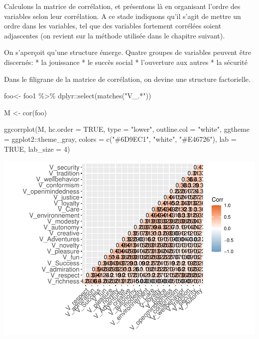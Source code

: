 \documentclass[
]{book}
\newenvironment{Shaded}{\begin{snugshade}}{\end{snugshade}}
\newcommand{\AttributeTok}[1]{\textcolor[rgb]{0.77,0.63,0.00}{#1}}
\newcommand{\ConstantTok}[1]{\textcolor[rgb]{0.00,0.00,0.00}{#1}}
\newcommand{\DecValTok}[1]{\textcolor[rgb]{0.00,0.00,0.81}{#1}}
\newcommand{\FunctionTok}[1]{\textcolor[rgb]{0.00,0.00,0.00}{#1}}
\newcommand{\NormalTok}[1]{#1}
\newcommand{\OtherTok}[1]{\textcolor[rgb]{0.56,0.35,0.01}{#1}}
\newcommand{\SpecialCharTok}[1]{\textcolor[rgb]{0.00,0.00,0.00}{#1}}
\newcommand{\StringTok}[1]{\textcolor[rgb]{0.31,0.60,0.02}{#1}}
\begin{document}
Calculons la matrice de corrélation, et présentons là en organisant l'ordre des variables selon leur corrélation. A ce stade indiquons qu'il s'agit de mettre un ordre dans les variables, tel que des variables fortement corrélées soient adjascentes (on revient sur la méthode utilisée dans le chapitre suivant).

On s'aperçoit qu'une structure émerge. Quatre groupes de variables peuvent être discernés:
* la jouissance
* le succès social
* l'ouverture aux autres
* la sécurité

Dans le filigrane de la matrice de corrélation, on devine une structure factorielle.

\begin{Shaded}
\begin{Highlighting}[]
\NormalTok{foo}\OtherTok{\textless{}{-}}\NormalTok{ foo1 }\SpecialCharTok{\%\textgreater{}\%} 
\NormalTok{  dplyr}\SpecialCharTok{::}\FunctionTok{select}\NormalTok{(}\FunctionTok{matches}\NormalTok{(}\StringTok{"V\_.*"}\NormalTok{))}

\NormalTok{M }\OtherTok{\textless{}{-}} \FunctionTok{cor}\NormalTok{(foo)}

\FunctionTok{ggcorrplot}\NormalTok{(M, }\AttributeTok{hc.order =} \ConstantTok{TRUE}\NormalTok{, }\AttributeTok{type =} \StringTok{"lower"}\NormalTok{,}
   \AttributeTok{outline.col =} \StringTok{"white"}\NormalTok{,}
   \AttributeTok{ggtheme =}\NormalTok{ ggplot2}\SpecialCharTok{::}\NormalTok{theme\_gray,}
   \AttributeTok{colors =} \FunctionTok{c}\NormalTok{(}\StringTok{"\#6D9EC1"}\NormalTok{, }\StringTok{"white"}\NormalTok{, }\StringTok{"\#E46726"}\NormalTok{), }\AttributeTok{lab =} \ConstantTok{TRUE}\NormalTok{, }\AttributeTok{lab\_size =} \DecValTok{4}\NormalTok{)}
\end{Highlighting}
\end{Shaded}

\includegraphics{bookdown-demo_files/figure-latex/0603b-1.pdf}
\end{document}
